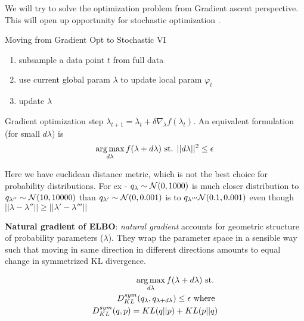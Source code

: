 We will try to solve the optimization problem from Gradient ascent perspective.
This will open up opportunity for stochastic optimization \cite{robbins1951stochastic}
\cite{robbins1985stochastic}.

Moving from Gradient Opt to Stochastic VI
\begin{enumerate}
  \item subsample a data point $t$ from full data
  \item use current global param $\lambda$ to update local param $\varphi_t$
  \item update $\lambda$
\end{enumerate}

Gradient optimization step $\lambda_{t + 1} = \lambda_{t} + \delta\nabla_{\lambda}f(\lambda_{t})$.
An equivalent formulation (for small $d\lambda$) is
\begin{align}
  \operatorname*{arg\,max}_{d\lambda} f(\lambda + d\lambda) \text{ st. } ||d\lambda||^2 \leq \epsilon
\end{align}

Here we have euclidean distance metric, which is not the best choice for 
probability distributions. For ex - $q_{\lambda} \sim \mathcal{N}(0, 1000)$ is much closer
distribution to $q_{\lambda{''}} \sim \mathcal{N}(10, 10000)$ than $q_{\lambda{'}} \sim \mathcal{N}(0, 0.001)$
is to $q_{\lambda{'''}}\mathcal{N}(0.1, 0.001)$ even though $||\lambda - \lambda{''}|| \geq ||\lambda{'} - \lambda{'''}||$

{\bf Natural gradient of ELBO}: \emph{natural gradient} accounts for geometric
structure of probability parameters ($\lambda$). They wrap the parameter space
in a sensible way such that moving in same direction in different directions
amounts to equal change in symmetrized KL divergence.

\begin{align}
  \operatorname*{arg\,max}_{d\lambda} f(\lambda + d\lambda) \text{ st. } \\\nonumber
  D^{sym}_{KL}(q_{\lambda}, q_{\lambda + d\lambda}) \leq \epsilon \text{ where } \\\nonumber
  D^{sym}_{KL}(q, p) = KL(q||p) + KL(p||q)
\end{align}

